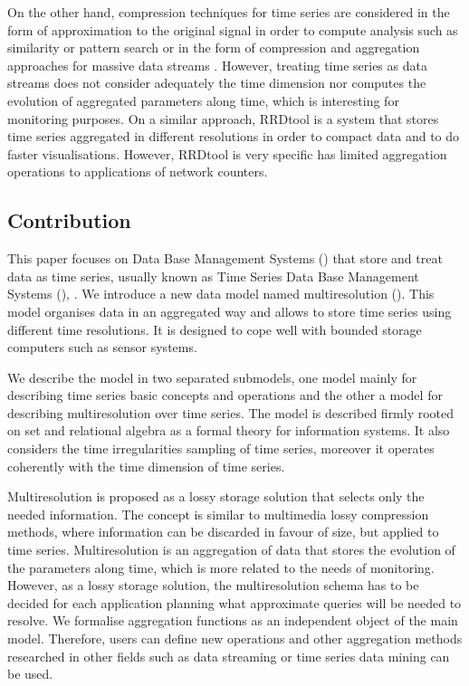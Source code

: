 On the other hand, compression techniques for time series are
considered in the form of approximation to the original signal in
order to compute analysis such as similarity or pattern search
\cite{fu11,keogh01,last01} or in the form of compression and
aggregation approaches for massive data streams
\cite{cormode08:pods,bonnet01}. However, treating time series as data
streams does not consider adequately the time dimension nor computes
the evolution of aggregated parameters along time, which is
interesting for monitoring purposes.  On a similar approach, RRDtool
\cite{rrdtool} is a system that stores time series aggregated in
different resolutions in order to compact data and to do faster
visualisations. However, RRDtool is very specific has limited
aggregation operations to applications of network counters.



\subsection{Contribution}



This paper focuses on Data Base Management Systems \linebreak[4]
() that store and treat data as time series, usually known
as Time Series Data Base Management Systems (),
\cite{dreyer94,last01}.  We introduce a new data model named
multiresolution  (). This model organises data
in an aggregated way and  allows to store time series using
different time resolutions. It is designed to cope well with bounded
storage computers such as sensor systems.  

We describe the model in two separated submodels, one 
model mainly for describing time series basic concepts and operations
and the other a  model for describing multiresolution over
time series. The model is described firmly rooted on set and
relational algebra as a formal theory for information systems.  It
also considers the time irregularities sampling of time series,
moreover it operates coherently with the time dimension of time
series.




Multiresolution is proposed as a lossy storage solution that selects
only the needed information. The concept is similar to multimedia
lossy compression methods, where information can be discarded in
favour of size, but applied to time series.  Multiresolution is an
aggregation of data that stores the evolution of the parameters along
time, which is more related to the needs of monitoring. However, as a
lossy storage solution, the multiresolution schema has to be decided
for each application planning what approximate queries will be needed
to resolve. We formalise aggregation functions as an independent
object of the main model. Therefore, users can define new operations
and other aggregation methods researched in other fields such as data
streaming or time series data mining can be used.


